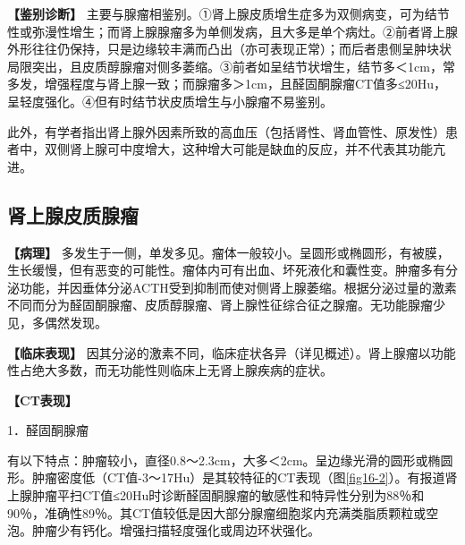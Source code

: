 \textbf{【鉴别诊断】}
主要与腺瘤相鉴别。①肾上腺皮质增生症多为双侧病变，可为结节性或弥漫性增生；而肾上腺腺瘤多为单侧发病，且大多是单个病灶。②前者肾上腺外形往往仍保持，只是边缘较丰满而凸出（亦可表现正常）；而后者患侧呈肿块状局限突出，且皮质醇腺瘤对侧多萎缩。③前者如呈结节状增生，结节多＜1cm，常多发，增强程度与肾上腺一致；而腺瘤多＞1cm，且醛固酮腺瘤CT值多≤20Hu，呈轻度强化。④但有时结节状皮质增生与小腺瘤不易鉴别。

此外，有学者指出肾上腺外因素所致的高血压（包括肾性、肾血管性、原发性）患者中，双侧肾上腺可中度增大，这种增大可能是缺血的反应，并不代表其功能亢进。

\subsection{肾上腺皮质腺瘤}

\textbf{【病理】}
多发生于一侧，单发多见。瘤体一般较小。呈圆形或椭圆形，有被膜，生长缓慢，但有恶变的可能性。瘤体内可有出血、坏死液化和囊性变。肿瘤多有分泌功能，并因垂体分泌ACTH受到抑制而使对侧肾上腺萎缩。根据分泌过量的激素不同而分为醛固酮腺瘤、皮质醇腺瘤、肾上腺性征综合征之腺瘤。无功能腺瘤少见，多偶然发现。

\textbf{【临床表现】}
因其分泌的激素不同，临床症状各异（详见概述）。肾上腺瘤以功能性占绝大多数，而无功能性则临床上无肾上腺疾病的症状。

\textbf{【CT表现】}

1．醛固酮腺瘤

有以下特点：肿瘤较小，直径0.8～2.3cm，大多＜2cm。呈边缘光滑的圆形或椭圆形。肿瘤密度低（CT值-3～17Hu）是其较特征的CT表现（图\ref{fig16-2}）。有报道肾上腺肿瘤平扫CT值≤20Hu时诊断醛固酮腺瘤的敏感性和特异性分别为88％和90％，准确性89％。其CT值较低是因大部分腺瘤细胞浆内充满类脂质颗粒或空泡。肿瘤少有钙化。增强扫描轻度强化或周边环状强化。

